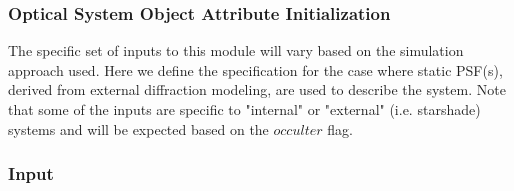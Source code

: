 \documentclass[cleanfoot]{asme2ej}
\begin{document}
\label{sec:opticalsystem}
\subsubsection{Optical System Object Attribute Initialization} 

The specific set of inputs to this module will vary based on the simulation approach used.  Here we define the specification for the case where static PSF(s), derived from external diffraction modeling, are used to describe the system.  Note that some of the inputs are specific to "internal" or "external" (i.e. starshade) systems and will be expected based on the $occulter$ flag.

\subsubsection*{Input}
\end{document}
